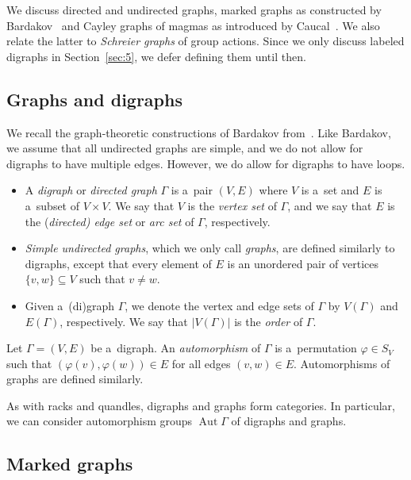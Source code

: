 \documentclass{jonasart}
\DeclareMathOperator{\Aut}{Aut}
\begin{document}
	We discuss directed and undirected graphs, marked graphs as constructed by Bardakov~\cite{bardakov} and Cayley graphs of magmas as introduced by Caucal~\cite{caucal}. We also relate the latter to \emph{Schreier graphs} of group actions. Since we only discuss labeled digraphs in Section~\ref{sec:5}, we defer defining them until then.

	\subsection{Graphs and digraphs}
    
    We recall the graph-theoretic constructions of Bardakov from~\cite{bardakov}. Like Bardakov, we assume that all undirected graphs are simple, and we do not allow for digraphs to have multiple edges. However, we do allow for digraphs to have loops.

	\begin{definition}
		\phantom{-}
		\begin{itemize}
			\item A \emph{digraph} or \emph{directed graph} $\Gamma$ is a~pair $(V,E)$ where $V$ is a~set and $E$ is a~subset of $V\times V$. We say that $V$ is the \emph{vertex set} of $\Gamma$, and we say that $E$ is the (\emph{directed\textup{)} edge set} or \emph{arc set} of $\Gamma$, respectively.
			\item \emph{Simple undirected graphs}, which we only call \emph{graphs}, are defined similarly to digraphs, except that every element of $E$ is an unordered pair of vertices $\{v,w\}\subseteq V$ such that $v\neq w$.
			\item Given a~(di)graph $\Gamma$, we denote the vertex and edge sets of $\Gamma$ by $V(\Gamma)$ and $E(\Gamma)$, respectively. We say that $|V(\Gamma)|$ is the \emph{order} of $\Gamma$.
		\end{itemize}
	\end{definition}

	\begin{definition}
		Let $\Gamma=(V,E)$ be a~digraph. An \emph{automorphism} of $\Gamma$ is a~permutation $\varphi\in S_V$ such that $(\varphi(v),\varphi(w))\in E$ for all edges $(v,w)\in E$. Automorphisms of graphs are defined similarly.
	\end{definition}

	As with racks and quandles, digraphs and graphs form categories. In particular, we can consider automorphism groups $\Aut\Gamma$ of digraphs and graphs.

	\subsection{Marked graphs}
    
\end{document}
